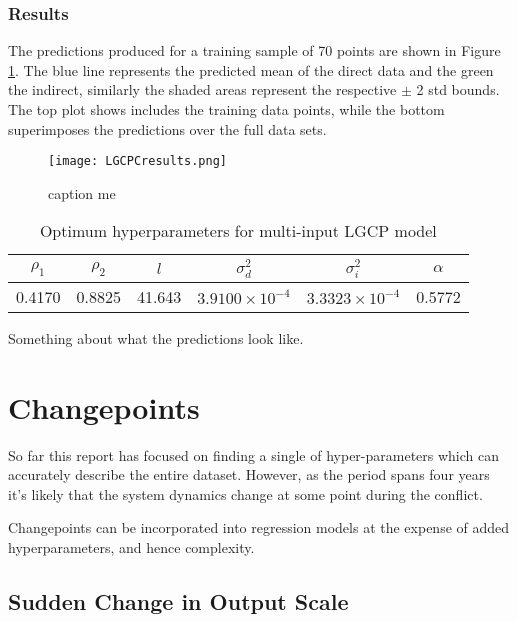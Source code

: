 \documentclass[a4paper,11pt]{report}
\begin{document}
\subsection{Results}
The predictions produced for a training sample of 70 points are shown in Figure \ref{fig:LGCPCresults}. The blue line represents the predicted mean of the direct data and the green the indirect, similarly the shaded areas represent the respective \(\pm\) 2 std bounds. The top plot shows includes the training data points, while the bottom superimposes the predictions over the full data sets. \par

\begin{figure}
\centering
\texttt{[image: LGCPCresults.png]}
\caption{caption me}
\label{fig:LGCPCresults}
\end{figure}

\begin{table}[]
\centering
\caption{Optimum hyperparameters for multi-input LGCP model}
\label{LGCPChyper}
\begin{tabular}{|c|c|c|c|c|c|}
\hline
\multicolumn{1}{|c|}{\(\rho_1\)} & \multicolumn{1}{c|}{\(\rho_2\)} & \(l\)                      & \(\sigma_d^2\)            & \(\sigma_i^2\)            & \(\alpha\) \\ \hline
0.4170                            & 0.8825                           & \multicolumn{1}{c|}{41.643} & \(3.9100 \times 10^{-4}\) & \(3.3323 \times 10^{-4}\) & 0.5772     \\ \hline
\end{tabular}
\end{table}

Something about what the predictions look like. 

\chapter{Changepoints}

So far this report has focused on finding a single of hyper-parameters which can accurately describe the entire dataset. However, as the period spans four years it's likely that the system dynamics change at some point during the conflict.



Changepoints can be incorporated into regression models at the expense of added hyperparameters, and hence complexity.

\section{Sudden Change in Output Scale}
\end{document}
